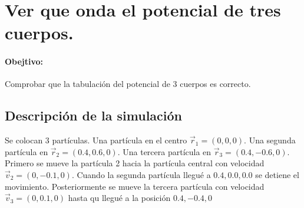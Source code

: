 \documentclass[../main.tex]{subfiles}
\begin{document}
\justifying

\section{Ver que onda el potencial de tres cuerpos.}

\paragraph{Obejtivo:} Comprobar que la tabulación del potencial de 3 cuerpos es correcto.

\subsection{Descripción de la simulación}

Se colocan 3 partículas.
Una partícula en el centro \(\vec{r}_1 = (0,0,0)\).
Una segunda partícula en \(\vec{r}_2 = (0.4,0.6,0)\).
Una tercera partícula en \(\vec{r}_3 = (0.4,-0.6,0)\).
Primero se mueve la partícula 2 hacia la partícula central con velocidad \(\vec{v}_2=(0,-0.1,0)\).
Cuando la segunda partícula llegué a \(0.4,0.0,0.0\) se detiene el movimiento.
Posteriormente se mueve la tercera partícula con velocidad \(\vec{v}_3=(0,0.1,0)\) hasta qu llegué a la posición \(0.4,-0.4,0\)
\end{document}
